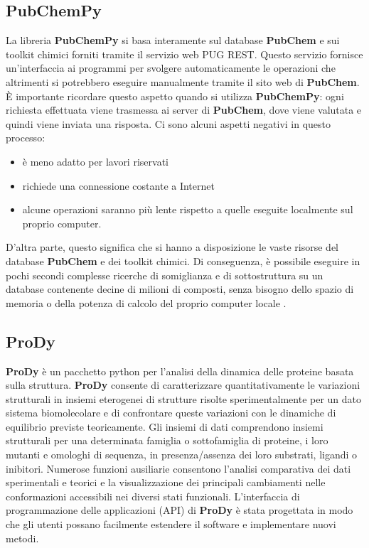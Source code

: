 \subsection{PubChemPy}
La libreria \textbf{PubChemPy} si basa interamente sul database \textbf{PubChem} e sui toolkit chimici forniti tramite il servizio web PUG REST. Questo servizio fornisce un'interfaccia ai programmi per svolgere automaticamente le operazioni che altrimenti si potrebbero eseguire manualmente tramite il sito web di \textbf{PubChem}. È importante ricordare questo aspetto quando si utilizza \textbf{PubChemPy}: ogni richiesta effettuata viene trasmessa ai server di \textbf{PubChem}, dove viene valutata e quindi viene inviata una risposta. Ci sono alcuni aspetti negativi in questo processo: 

\begin{itemize}
    \item è meno adatto per lavori riservati
    \item richiede una connessione costante a Internet
    \item alcune operazioni saranno più lente rispetto a quelle eseguite localmente sul proprio computer.
\end{itemize}

D'altra parte, questo significa che si hanno a disposizione le vaste risorse del database \textbf{PubChem} e dei toolkit chimici. Di conseguenza, è possibile eseguire in pochi secondi complesse ricerche di somiglianza e di sottostruttura su un database contenente decine di milioni di composti, senza bisogno dello spazio di memoria o della potenza di calcolo del proprio computer locale \cite{PubChempyDocumentation}.

\subsection{ProDy}
\textbf{ProDy} è un pacchetto python per l'analisi della dinamica delle proteine basata sulla struttura. \textbf{ProDy} consente di caratterizzare quantitativamente le variazioni strutturali in insiemi eterogenei di strutture risolte sperimentalmente per un dato sistema biomolecolare e di confrontare queste variazioni con le dinamiche di equilibrio previste teoricamente. Gli insiemi di dati comprendono insiemi strutturali per una determinata famiglia o sottofamiglia di proteine, i loro mutanti e omologhi di sequenza, in presenza/assenza dei loro substrati, ligandi o inibitori. Numerose funzioni ausiliarie consentono l'analisi comparativa dei dati sperimentali e teorici e la visualizzazione dei principali cambiamenti nelle conformazioni accessibili nei diversi stati funzionali. L'interfaccia di programmazione delle applicazioni (API) di \textbf{ProDy} è stata progettata in modo che gli utenti possano facilmente estendere il software e implementare nuovi metodi\cite{10.1093/bioinformatics/btr168}.

